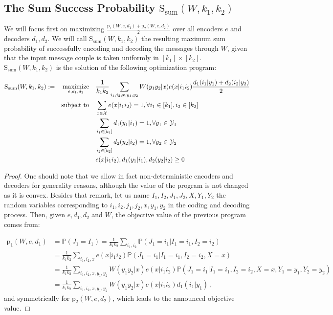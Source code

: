 \subsection{The Sum Success Probability $\mathrm{S}_{\text{sum}}(W,k_1,k_2)$}
We will focus first on maximizing $\frac{\mathrm{p}_1(W,e,d_1)+\mathrm{p}_2(W,e,d_2)}{2}$ over all encoders $e$ and decoders $d_1,d_2$. We will call $\mathrm{S}_{\text{sum}}(W,k_1,k_2)$ the resulting maximum sum probability of successfully encoding and decoding the messages through $W$, given that the input message couple is taken uniformly in $[k_1] \times [k_2]$. $\mathrm{S}_{\text{sum}}(W,k_1,k_2)$ is the solution of the following optimization program:


\begin{equation}
  \begin{aligned}
    \mathrm{S}_{\text{sum}}(W,k_1,k_2) := &&\underset{e,d_1,d_2}{\operatorname{\text{maximize}}} &&& \frac{1}{k_1k_2}\sum_{i_1,i_2,x,y_1,y_2} W(y_1y_2|x)e(x|i_1i_2)\frac{d_1(i_1|y_1) + d_2(i_2|y_2)}{2}\\
    &&\operatorname{\text{subject to}} &&& \sum_{x \in \mathcal{X}} e(x|i_1i_2) = 1, \forall i_1 \in [k_1], i_2 \in [k_2]\\
    &&&&& \sum_{i_1 \in [k_1]} d_1(y_1|i_1) = 1, \forall y_1 \in \mathcal{Y}_1\\
    &&&&& \sum_{i_2 \in [k_2]} d_2(y_2|i_2) = 1, \forall y_2 \in \mathcal{Y}_2\\
    &&&&& e(x|i_1i_2), d_1(y_1|i_1), d_2(y_2|i_2) \geq 0
  \end{aligned}
\end{equation}

\begin{proof}
One should note that we allow in fact non-deterministic encoders and decoders for generality reasons, although the value of the program is not changed as it is convex. Besides that remark, let us name $I_1,I_2,J_1,J_2,X,Y_1,Y_2$ the random variables corresponding to $i_1,i_2,j_1,j_2,x,y_1,y_2$ in the coding and decoding process. Then, given $e,d_1,d_2$ and $W$, the objective value of the previous program comes from:

\begin{equation}
  \begin{aligned}
    \mathrm{p}_1(W,e,d_1) &= \mathbb{P}\left(J_1 = I_1\right) = \frac{1}{k_1k_2}\sum_{i_1,i_2} \mathbb{P}\left(J_1 = i_1|I_1=i_1,I_2=i_2\right)\\
    &= \frac{1}{k_1k_2}\sum_{i_1,i_2,x}e(x|i_1i_2) \mathbb{P}\left(J_1 = i_1|I_1=i_1,I_2=i_2,X=x\right)\\
    &= \frac{1}{k_1k_2}\sum_{i_1,i_2,x,y_1,y_2}W(y_1y_2|x)e(x|i_1i_2) \mathbb{P}\left(J_1 = i_1|I_1=i_1,I_2=i_2,X=x,Y_1=y_1,Y_2=y_2\right)\\
    &= \frac{1}{k_1k_2}\sum_{i_1,i_2,x,y_1,y_2}W(y_1y_2|x)e(x|i_1i_2)d_1(i_1|y_1) \ ,
  \end{aligned}
\end{equation}
and symmetrically for $\mathrm{p}_2(W,e,d_2)$, which leads to the announced objective value.
\end{proof}

